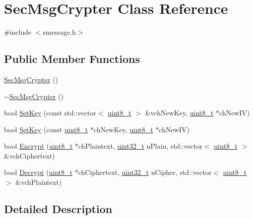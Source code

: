 \hypertarget{class_sec_msg_crypter}{}\section{Sec\+Msg\+Crypter Class Reference}
\label{class_sec_msg_crypter}


{\ttfamily \#include $<$smessage.\+h$>$}

\subsection*{Public Member Functions}
\begin{DoxyCompactItemize}
\item 
\hyperlink{class_sec_msg_crypter_a9ad7ff90747e0ed5e3670206aabcbaf6}{Sec\+Msg\+Crypter} ()
\item 
\hyperlink{class_sec_msg_crypter_a366a49eed14dce915015fd467e3f4169}{$\sim$\+Sec\+Msg\+Crypter} ()
\item 
bool \hyperlink{class_sec_msg_crypter_a16056670b845c1e9fc28232feee9efd5}{Set\+Key} (const std\+::vector$<$ \hyperlink{stdint_8h_aba7bc1797add20fe3efdf37ced1182c5}{uint8\+\_\+t} $>$ \&vch\+New\+Key, \hyperlink{stdint_8h_aba7bc1797add20fe3efdf37ced1182c5}{uint8\+\_\+t} $\ast$ch\+New\+I\+V)
\item 
bool \hyperlink{class_sec_msg_crypter_a5ed79b6b7217c58cbea219a93c32c4de}{Set\+Key} (const \hyperlink{stdint_8h_aba7bc1797add20fe3efdf37ced1182c5}{uint8\+\_\+t} $\ast$ch\+New\+Key, \hyperlink{stdint_8h_aba7bc1797add20fe3efdf37ced1182c5}{uint8\+\_\+t} $\ast$ch\+New\+I\+V)
\item 
bool \hyperlink{class_sec_msg_crypter_abcd38cca1e7e04486ea959d71465da09}{Encrypt} (\hyperlink{stdint_8h_aba7bc1797add20fe3efdf37ced1182c5}{uint8\+\_\+t} $\ast$ch\+Plaintext, \hyperlink{stdint_8h_a435d1572bf3f880d55459d9805097f62}{uint32\+\_\+t} n\+Plain, std\+::vector$<$ \hyperlink{stdint_8h_aba7bc1797add20fe3efdf37ced1182c5}{uint8\+\_\+t} $>$ \&vch\+Ciphertext)
\item 
bool \hyperlink{class_sec_msg_crypter_a7ede11e62c67b4c1b205f2ddc9402ddb}{Decrypt} (\hyperlink{stdint_8h_aba7bc1797add20fe3efdf37ced1182c5}{uint8\+\_\+t} $\ast$ch\+Ciphertext, \hyperlink{stdint_8h_a435d1572bf3f880d55459d9805097f62}{uint32\+\_\+t} n\+Cipher, std\+::vector$<$ \hyperlink{stdint_8h_aba7bc1797add20fe3efdf37ced1182c5}{uint8\+\_\+t} $>$ \&vch\+Plaintext)
\end{DoxyCompactItemize}


\subsection{Detailed Description}



